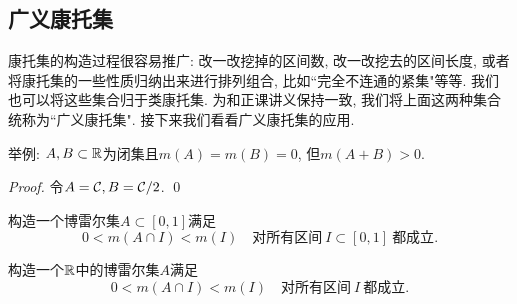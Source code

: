 \subsection{广义康托集}
康托集的构造过程很容易推广: 改一改挖掉的区间数, 改一改挖去的区间长度,
或者将康托集的一些性质归纳出来进行排列组合, 比如``完全不连通的紧集"等等. 我们也可以将这些集合归于类康托集. 为和正课讲义保持一致, 我们将上面这两种集合统称为``广义康托集". 接下来我们看看广义康托集的应用. 

\begin{example} %
    举例: $A, B \subset \mathbb{R}$为闭集且$m(A)=m(B)=0$, 但$m(A+B)>0$.
\end{example}
\begin{proof}
    令$A = \mathcal{C}, B = \mathcal{C} / 2$. 
    \qed
\end{proof}


\begin{example}
    构造一个博雷尔集$A \subset [0,1]$满足
    $$ 0<m(A \cap I)<m(I) \quad \text{对所有区间}~I \subset [0,1]~\text{都成立}. $$
\end{example}






\begin{example}
    构造一个$\mathbb{R}$中的博雷尔集$A$满足
    $$ 0<m(A \cap I)<m(I) \quad \text{对所有区间}~I~\text{都成立}. $$
\end{example}
\begin{solution}


    
\end{solution}

